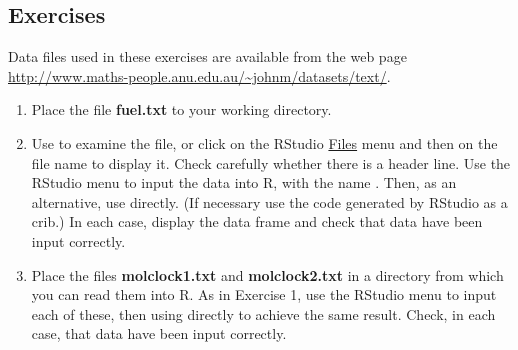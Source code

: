 \subsection{Exercises}\label{ss:wd}
Data files used in these exercises are available from the web
page  \url{http://www.maths-people.anu.edu.au/~johnm/datasets/text/}.

\begin{enumerate}
\item
Place the file \textbf{fuel.txt} to your working directory.
\item Use  to examine the file, or click on the
  RStudio \underline{Files} menu and then on the file name to display
  it.  Check carefully whether there is a header line.  Use the
  RStudio menu to input the data into R, with the name .
  Then, as an alternative, use  directly.  (If
  necessary use the code generated by RStudio as a crib.)  In each
  case, display the data frame and check that data have been input
  correctly.
\item {} Place the files
  \textbf{molclock1.txt} and \textbf{molclock2.txt} in a directory
  from which you can read them into R.  As in Exercise 1, use the
  RStudio menu to input each of these, then using
   directly to achieve the same result.  Check,
  in each case, that data have been input correctly.


\end{enumerate}
